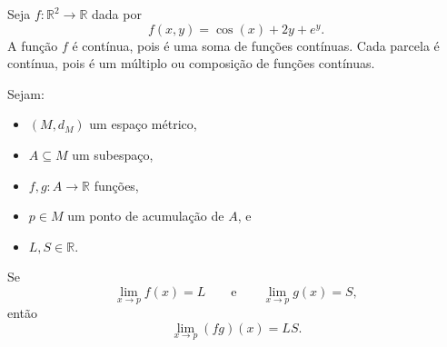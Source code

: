 \begin{example}
    Seja $f:\mathbb R^2\to\mathbb R$ dada por
    \[
        f(x,y)=\cos(x)+2y+e^y.
    \]
    A função $f$ é contínua, pois é uma soma de funções contínuas.
    Cada parcela é contínua, pois é um múltiplo ou composição de funções contínuas.
\end{example}

\begin{proposition}
    Sejam:
    \begin{itemize}
        \item $(M,d_M)$ um espaço métrico,
        \item $A\subseteq M$ um subespaço,
        \item $f,g:A\to\mathbb R$ funções,
        \item $p\in M$ um ponto de acumulação de $A$, e
        \item $L,S\in\mathbb R$.
    \end{itemize}

    Se
    \[
        \lim_{x\to p}f(x)=L
        \qquad\text{e}\qquad
        \lim_{x\to p}g(x)=S,
    \]
    então
    \[
        \lim_{x\to p}(fg)(x)=LS.
    \]
\end{proposition}

